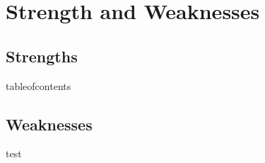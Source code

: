 \section{Strength and Weaknesses}

\subsection{Strengths}

tableofcontents

\subsection{Weaknesses}

test